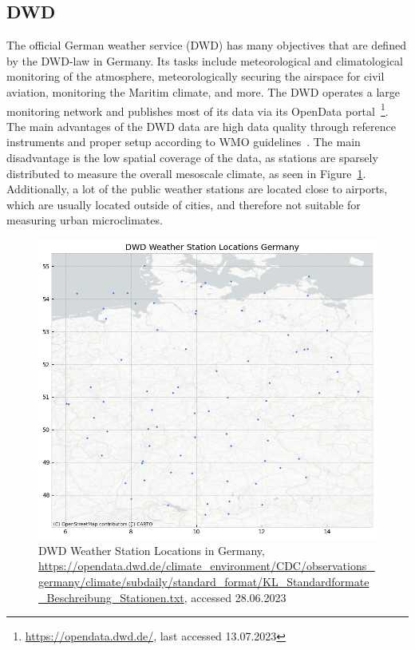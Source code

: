 \subsection{DWD}

The official German weather service (DWD) has many objectives that are defined by the DWD-law in Germany. Its tasks include meteorological and climatological monitoring of the atmosphere, meteorologically securing the airspace for civil aviation, monitoring the Maritim climate, and more. The DWD operates a large monitoring network and publishes most of its data via its OpenData portal~\footnote{\url{https://opendata.dwd.de/}, last accessed 13.07.2023}.\\
The main advantages of the DWD data are high data quality through reference instruments and proper setup according to WMO guidelines~\cite{wmo2018guide}. The main disadvantage is the low spatial coverage of the data, as stations are sparsely distributed to measure the overall mesoscale climate, as seen in Figure~\ref{fig:dwd sensor locations germany}. Additionally, a lot of the public weather stations are located close to airports, which are usually located outside of cities, and therefore not suitable for measuring urban microclimates.

\begin{figure}[ht]
    \centering
    \includegraphics[width=1\textwidth]{images/dwd_weather_station_locations_germany.png}
    \caption{DWD Weather Station Locations in Germany, \url{https://opendata.dwd.de/climate_environment/CDC/observations_germany/climate/subdaily/standard_format/KL_Standardformate_Beschreibung_Stationen.txt}, accessed 28.06.2023}
    \label{fig:dwd sensor locations germany}
\end{figure}

